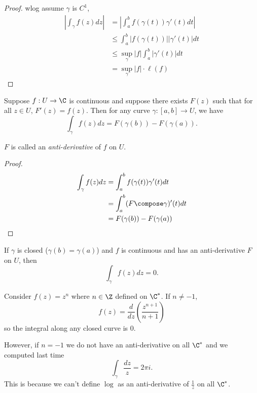 \documentclass[a4paper]{article}
\begin{document}
\begin{proof}
  wlog assume \(\gamma\) is \(C^1\),
  \begin{align*}
    \left| \int_\gamma f(z)dz \right| &= \left| \int_a^bf(\gamma(t))\gamma'(t)dt \right| \\
                                      &\leq \int_a^b |f(\gamma(t))||\gamma'(t)| dt \\
                                      &\leq \sup_\gamma|f| \int_a^b |\gamma'(t)| dt \\
                                      &= \sup_\gamma|f| \cdot \ell(f)
  \end{align*}
\end{proof}

\begin{theorem}
  Suppose \(f: U \to \C\) is continuous and suppose there exists \(F(z)\) such that for all \(z \in U\), \(F'(z) = f(z)\). Then for any curve \(\gamma: [a, b] \to U\), we have
  \[
    \int_\gamma f(z) dz = F(\gamma(b)) - F(\gamma(a)).
  \]
\end{theorem}

\begin{note}
  \(F\) is called an \emph{anti-derivative} of \(f\) on \(U\).
\end{note}

\begin{proof}
  \begin{align*}
    \int_\gamma f(z)dz
    &= \int_a^b f(\gamma(t))\gamma'(t) dt \\
    &= \int_a^b (F \compose \gamma)'(t) dt \\
    &= F(\gamma(b)) - F(\gamma(a))
  \end{align*}
\end{proof}

\begin{corollary}
  If \(\gamma\) is closed (\(\gamma(b) = \gamma(a)\)) and \(f\) is continuous and has an anti-derivative \(F\) on  \(U\), then
  \[
    \int_\gamma f(z)dz = 0.
  \]
\end{corollary}

\begin{eg}
  Consider \(f(z) = z^n\) where \(n \in \Z\) defined on \(\C^*\). If \(n \neq -1\),
  \[
    f(z) = \frac{d}{dz} \left( \frac{z^{n + 1}}{n + 1} \right)
  \]
  so the integral along any closed curve is \(0\).

  However, if \(n = -1\) we do not have an anti-derivative on all \(\C^*\) and we computed last time
  \[
    \int_\gamma \frac{dz}{z} = 2\pi i.
  \]
  This is because we can't define \(\log\) as an anti-derivative of \(\frac{1}{z}\) on all \(\C^*\).
\end{eg}
\end{document}
